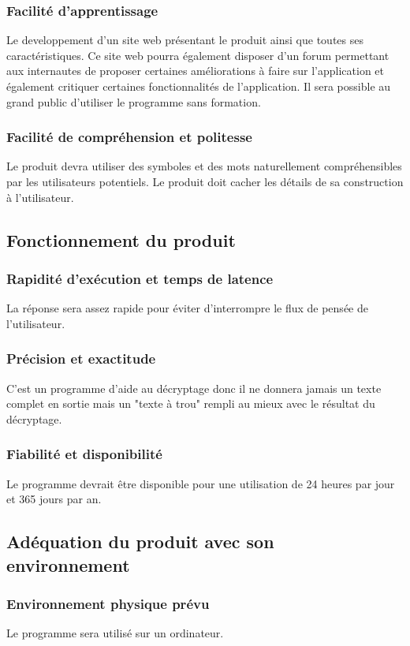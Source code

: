 \documentclass[a4]{article}
\begin{document}
			\subsubsection {Facilité d'apprentissage}
				Le developpement d'un site web présentant le produit ainsi que toutes ses caractéristiques. Ce site web pourra également disposer d'un forum permettant aux internautes de proposer certaines	améliorations à faire sur l'application et également critiquer certaines fonctionnalités de l'application.
				Il sera possible au grand public d’utiliser le programme sans formation.
			\subsubsection {Facilité de compréhension et politesse}
				Le produit devra utiliser des symboles et des mots naturellement compréhensibles par les
				utilisateurs potentiels.
				Le produit doit cacher les détails de sa construction à l’utilisateur.

		\subsection{Fonctionnement du produit}
			\subsubsection {Rapidité d’exécution et temps de latence}
				La réponse sera assez rapide pour éviter d’interrompre le flux de pensée de l’utilisateur.

			\subsubsection {Précision et exactitude}
				C'est un programme d'aide au décryptage donc il ne donnera jamais un texte complet en sortie 					mais un "texte à trou" rempli au mieux avec le résultat du décryptage.
			\subsubsection {Fiabilité et disponibilité}
				Le programme devrait être disponible pour une utilisation de 24 heures par jour et 365 jours
				par an. 

		\subsection{Adéquation du produit avec son environnement}
			\subsubsection {Environnement physique prévu}
				Le programme sera utilisé sur un ordinateur.
\end{document}
